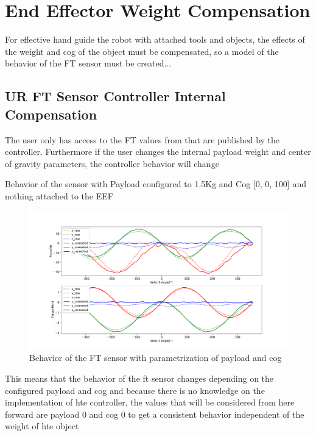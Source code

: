 \section{End Effector Weight Compensation}

\par For effective hand guide the robot with attached tools and objects, the effects of the weight and cog of the object must be compensated, so a model of the behavior of the FT sensor must be created...

\subsection{UR FT Sensor Controller Internal Compensation}
\label{ssec:ft_internal_comp}

\par The user only has access to the FT values from that are published by the controller. Furthermore if the user changes the internal payload weight and center of gravity parameters, the controller behavior will change

\par Behavior of the sensor with Payload configured to 1.5Kg and Cog [0, 0, 100] and nothing attached to the EEF

\begin{figure}[h]
    \centering
    \includegraphics[width=\linewidth]{figs/chp3/ft_sensor_behavior.pdf}
    \caption{Behavior of the FT sensor with parametrization of payload and cog }
    \label{fig:ft_sensor_behavior}
\end{figure}

\par This means that the behavior of the ft sensor changes depending on the configured payload and cog and because there is no knowledge on the implementation of hte controller, the values that will be considered from here forward are payload 0 and cog 0 to get a consistent behavior independent of the weight of hte object 


